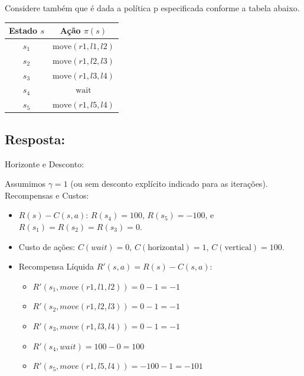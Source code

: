 \documentclass[a4paper,12pt]{article}
\begin{document}
Considere também que é dada a política p especificada conforme a tabela abaixo.

\begin{table}[h!]
	\centering
	\begin{tabular}{|c|c|}
		\hline
		\textbf{Estado $s$} & \textbf{Ação $\pi(s)$} \\ \hline
		$s_1$ & $\text{move}(r1, l1, l2)$ \\ \hline
		$s_2$ & $\text{move}(r1, l2, l3)$ \\ \hline
		$s_3$ & $\text{move}(r1, l3, l4)$ \\ \hline
		$s_4$ & $\text{wait}$ \\ \hline
		$s_5$ & $\text{move}(r1, l5, l4)$ \\ \hline
	\end{tabular}
\end{table}

\subsection*{Resposta:}

\bigskip

Horizonte e Desconto: 

Assumimos $\gamma = 1$ (ou sem desconto explícito indicado para as iterações).  \\

Recompensas e Custos: 
\begin{itemize}
	\item $R(s) - C(s,a)$:  $R(s_4) = 100$, $R(s_5) = -100$, e $R(s_1) = R(s_2) = R(s_3) = 0$.
	\item Custo de ações: $C(wait) = 0$, $C(\text{horizontal}) = 1$, $C(\text{vertical}) = 100$.
	\item Recompensa Líquida $R'(s,a) = R(s) - C(s,a)$:
	\begin{itemize}
		\item $R'(s_1, move(r1, l1, l2)) = 0 - 1 = -1$
		\item $R'(s_2, move(r1, l2, l3)) = 0 - 1 = -1$
		\item $R'(s_3, move(r1, l3, l4)) = 0 - 1 = -1$
		\item $R'(s_4, wait) = 100 - 0 = 100$
		\item $R'(s_5, move(r1, l5, l4)) = -100 - 1 = -101$ \\
	\end{itemize}
\end{itemize}
\end{document}
